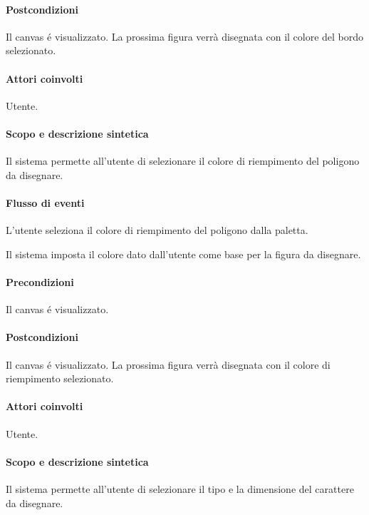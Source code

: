 \paragraph{Postcondizioni} Il canvas \'e visualizzato. La prossima figura verr\` a disegnata con il colore del bordo selezionato.

\paragraph{Attori coinvolti} Utente.
\paragraph{Scopo e descrizione sintetica} 
Il sistema permette all'utente di selezionare il colore di riempimento del poligono da disegnare.
\paragraph{Flusso di eventi}
\begin{elenconumerato}[\textbf{}]{\subsubsecindent}
\item L'utente seleziona il colore di riempimento del poligono dalla paletta.
\item Il sistema imposta il colore dato dall'utente come base per la figura da disegnare.
\end{elenconumerato}
\paragraph{Precondizioni} Il canvas \'e visualizzato.
\paragraph{Postcondizioni} Il canvas \'e visualizzato. La prossima figura verr\` a disegnata con il colore di riempimento selezionato.

\paragraph{Attori coinvolti} Utente.
\paragraph{Scopo e descrizione sintetica} 
Il sistema permette all'utente di selezionare il tipo e la dimensione del carattere da disegnare.
